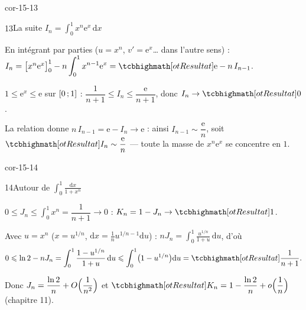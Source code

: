 \begin{blocLivre}{cor-15-13}
\begin{corrige}{13}{La suite $I_n=\int_0^1 x^{n}\mathrm{e}^{x}\,\mathrm{d}x$}
\begin{questions}
  \item En intégrant par parties ($u=x^{n}$, $v'=\mathrm{e}^{x}$… dans
    l'autre sens) : $I_n=\bigl[x^{n}\mathrm{e}^{x}\bigr]_0^1
    -n\displaystyle\int_{0}^{1}x^{n-1}\mathrm{e}^{x}
    =\res{\mathrm{e}-n\,I_{n-1}}$.
  \item $1\leqslant\mathrm{e}^{x}\leqslant\mathrm{e}$ sur $\mathopen{[}0\,{;}\,1\mathclose{]}$ :
    $\dfrac{1}{n+1}\leqslant I_n\leqslant\dfrac{\mathrm{e}}{n+1}$, donc
    $I_n\to\res{0}$.
  \item La relation donne $n\,I_{n-1}=\mathrm{e}-I_n\to\mathrm{e}$ :
    ainsi $I_{n-1}\sim\dfrac{\mathrm{e}}{n}$, soit
    $\res{I_n\sim\dfrac{\mathrm{e}}{n}}$ — toute la masse de
    $x^{n}\mathrm{e}^{x}$ se concentre en $1$.
\end{questions}
\end{corrige}
\end{blocLivre}

\begin{blocLivre}{cor-15-14}
\begin{corrige}{14}{Autour de $\int_0^1\frac{\mathrm{d}x}{1+x^{n}}$}
\begin{questions}
  \item $0\leqslant J_n\leqslant\displaystyle\int_{0}^{1}x^{n}
    =\dfrac{1}{n+1}\to0$ : $K_n=1-J_n\to\res{1}$.
  \item Avec $u=x^{n}$ ($x=u^{1/n}$,
    $\mathrm{d}x=\tfrac1n u^{1/n-1}\mathrm{d}u$) :
    $nJ_n=\displaystyle\int_{0}^{1}\frac{u^{1/n}}{1+u}\,\mathrm{d}u$, d'où
    \[
    0\leqslant\ln2-nJ_n
    =\int_{0}^{1}\frac{1-u^{1/n}}{1+u}\,\mathrm{d}u
    \leqslant\int_{0}^{1}\bigl(1-u^{1/n}\bigr)\mathrm{d}u
    =\res{\frac{1}{n+1}} .
    \]
  \item Donc $J_n=\dfrac{\ln2}{n}+O\Bigl(\dfrac{1}{n^{2}}\Bigr)$ et
    $\res{K_n=1-\dfrac{\ln2}{n}+o\Bigl(\dfrac1n\Bigr)}$ (chapitre 11).
\end{questions}
\end{corrige}
\end{blocLivre}

